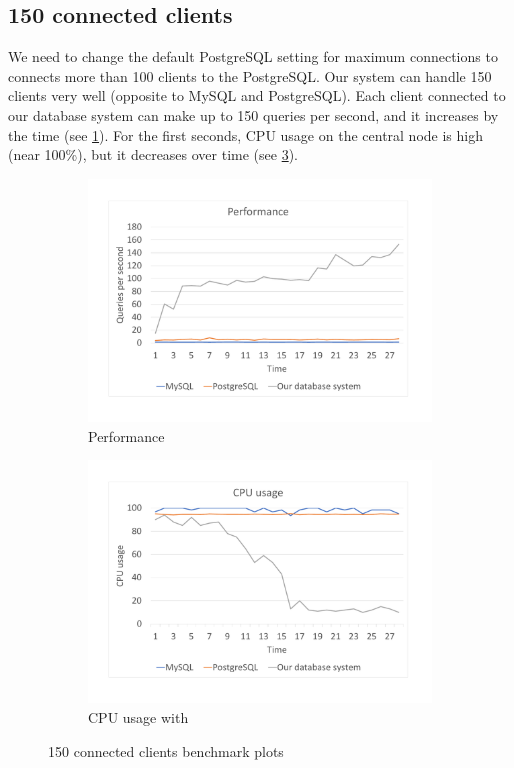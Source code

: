 \subsection*{150 connected clients}
We need to change the default PostgreSQL setting for maximum connections to connects more than 100 clients to the PostgreSQL. Our system can handle 150 clients very well (opposite to MySQL and PostgreSQL). Each client connected to our database system can make up to 150 queries per second, and it increases by the time (see \ref{bench150per}). For the first seconds, CPU usage on the central node is high (near 100\%), but it decreases over time (see \ref{bench150cpu}).

\begin{figure}[h]
    \begin{subfigure}{.5\textwidth}
        \centering
        \includegraphics[trim={1.78cm 2cm 2.08cm 1cm},clip,width=1.0\linewidth]{excel/150per.pdf}
        \caption{Performance}
        \label{bench150per}
    \end{subfigure}
    \begin{subfigure}{.5\textwidth}
        \centering
        \includegraphics[trim={1.78cm 2cm 2.08cm 1cm},clip,width=1.0\linewidth]{excel/150cpu.pdf}
        \caption{CPU usage with}
        \label{bench150cpu}
    \end{subfigure}
    \caption{150 connected clients benchmark plots}
\end{figure}

